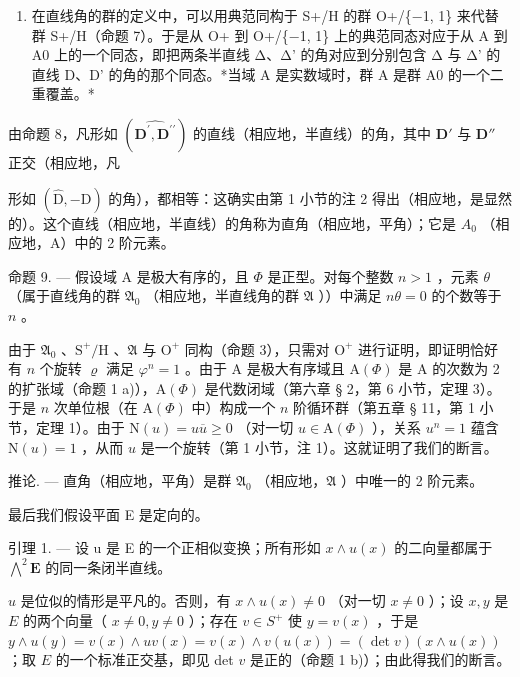 \begin{enumerate}
\def\labelenumi{\arabic{enumi})}
\setcounter{enumi}{1}
\tightlist
\item
  在直线角的群的定义中，可以用典范同构于 S+/H 的群 O+/\{−1, 1\} 来代替群 S+/H（命题 7）。于是从 O+ 到 O+/\{−1, 1\} 上的典范同态对应于从 A 到 A0 上的一个同态，即把两条半直线 Δ、Δ' 的角对应到分别包含 Δ 与 Δ' 的直线 D、D' 的角的那个同态。*当域 A 是实数域时，群 A 是群 A0 的一个二重覆盖。*
\end{enumerate}

由命题 8，凡形如 \((\widehat{\mathbf{D}^{\prime},\mathbf{D}^{\prime\prime}})\) 的直线（相应地，半直线）的角，其中 \(\mathbf{D}'\) 与 \(\mathbf{D}''\) 正交（相应地，凡

形如 \((\widehat{\mathrm{D}}, -\mathrm{D})\) 的角），都相等：这确实由第 1 小节的注 2 得出（相应地，是显然的）。这个直线（相应地，半直线）的角称为直角（相应地，平角）；它是 \(A_{0}\) （相应地，A）中的 2 阶元素。

命题 9. --- 假设域 A 是极大有序的，且 \(\Phi\) 是正型。对每个整数 \(n>1\) ，元素 \(\theta\) （属于直线角的群 \(\mathfrak{A}_{0}\) （相应地，半直线角的群 \(\mathfrak{A}\) ））中满足 \(n\theta=0\) 的个数等于 \(n\) 。

由于 \(\mathfrak{A}_{0}\) 、\(\mathrm{S}^{+}/\mathrm{H}\) 、\(\mathfrak{A}\) 与 \(\mathrm{O}^{+}\) 同构（命题 3），只需对 \(\mathrm{O}^{+}\) 进行证明，即证明恰好有 \(n\) 个旋转 \(\varrho\) 满足 \(\varphi^{n}=1\) 。由于 A 是极大有序域且 \(\mathrm{A}(\Phi)\) 是 A 的次数为 2 的扩张域（命题 1 a)），\(\mathrm{A}(\Phi)\) 是代数闭域（第六章 § 2，第 6 小节，定理 3）。于是 \(n\) 次单位根（在 \(\mathrm{A}(\Phi)\) 中）构成一个 \(n\) 阶循环群（第五章 § 11，第 1 小节，定理 1）。由于 \(\mathrm{N}(u)=u\overline{u}\geqslant0\) （对一切 \(u\in\mathrm{A}(\Phi)\) ），关系 \(u^{n}=1\) 蕴含 \(\mathrm{N}(u)=1\) ，从而 \(u\) 是一个旋转（第 1 小节，注 1）。这就证明了我们的断言。

推论. --- 直角（相应地，平角）是群 \(\mathfrak{A}_{0}\) （相应地，\(\mathfrak{A}\) ）中唯一的 2 阶元素。

最后我们假设平面 E 是定向的。

引理 1. --- 设 u 是 E 的一个正相似变换；所有形如 \(x \wedge u(x)\) 的二向量都属于 \(\bigwedge^{2}\mathbf{E}\) 的同一条闭半直线。

\(u\) 是位似的情形是平凡的。否则，有 \(x \wedge u(x) \neq 0\) （对一切 \(x \neq 0\) ）；设 \(x, y\) 是 \(E\) 的两个向量（ \(x \neq 0, y \neq 0\) ）；存在 \(v \in S^+\) 使 \(y = v(x)\) ，于是 \(y \wedge u(y) = v(x) \wedge uv(x) = v(x) \wedge v(u(x)) = (\det v)(x \wedge u(x))\) ；取 \(E\) 的一个标准正交基，即见 det \(v\) 是正的（命题 1 b)）；由此得我们的断言。

